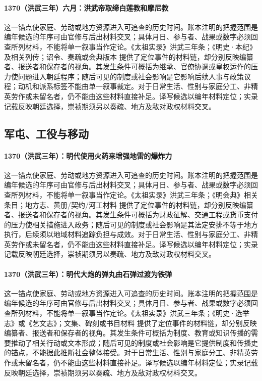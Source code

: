 \paragraph{1370（洪武三年）六月：洪武帝取缔白莲教和摩尼教} 这一锚点使家庭、劳动或地方资源进入可追查的历史时间。账本注明的把握范围是编年候选的年序可由官修与后出材料交叉；具体月日、参与者、战果或数字必须回查所列材料，不能将单一叙事当作定论。《太祖实录》洪武三年条；《明史·本纪》及相关列传；诏令、奏疏或会典版本 提供了定位事件的材料链，却分别反映编纂者、报送者和保存者的视角。其发生条件可概括为继承、官僚协调或皇权运作的压力使问题进入朝廷程序；随后可见的制度或社会影响是它影响后续人事与政策议程；动机和派系标签不能由单一叙事裁定。对于日常生活、性别与家庭分工、非精英劳作或未留名者，仍不能由这些材料直接补足。译写候选以编年材料定位；实录记载反映朝廷选择，崇祯期须另以奏疏、地方及敌对政权材料交叉。

\subsection{军屯、工役与移动}

\paragraph{1370（洪武三年）：明代使用火药来增强地雷的爆炸力} 这一锚点使家庭、劳动或地方资源进入可追查的历史时间。账本注明的把握范围是编年候选的年序可由官修与后出材料交叉；具体月日、参与者、战果或数字必须回查所列材料，不能将单一叙事当作定论。《太祖实录》洪武三年条；《明会典》相关条目；地方志、黄册/契约/河工材料 提供了定位事件的材料链，却分别反映编纂者、报送者和保存者的视角。其发生条件可概括为财政征解、交通工程或货币支付的压力使相关措施进入政务；随后可见的制度或社会影响是其法定安排不等于地方执行，后续须以地域材料追踪负担与成效。对于日常生活、性别与家庭分工、非精英劳作或未留名者，仍不能由这些材料直接补足。译写候选以编年材料定位；实录记载反映朝廷选择，崇祯期须另以奏疏、地方及敌对政权材料交叉。

\paragraph{1370（洪武三年）：明代大炮的弹丸由石弹过渡为铁弹} 这一锚点使家庭、劳动或地方资源进入可追查的历史时间。账本注明的把握范围是编年候选的年序可由官修与后出材料交叉；具体月日、参与者、战果或数字必须回查所列材料，不能将单一叙事当作定论。《太祖实录》洪武三年条；《明史·选举志》或《艺文志》；文集、碑刻或书目材料 提供了定位事件的材料链，却分别反映编纂者、报送者和保存者的视角。其发生条件可概括为制度、教育或知识传播的需要推动了相关行动或文本形成；随后可见的制度或社会影响是它提供制度和传播史的锚点，不能据此推断社会整体接受。对于日常生活、性别与家庭分工、非精英劳作或未留名者，仍不能由这些材料直接补足。译写候选以编年材料定位；实录记载反映朝廷选择，崇祯期须另以奏疏、地方及敌对政权材料交叉。

